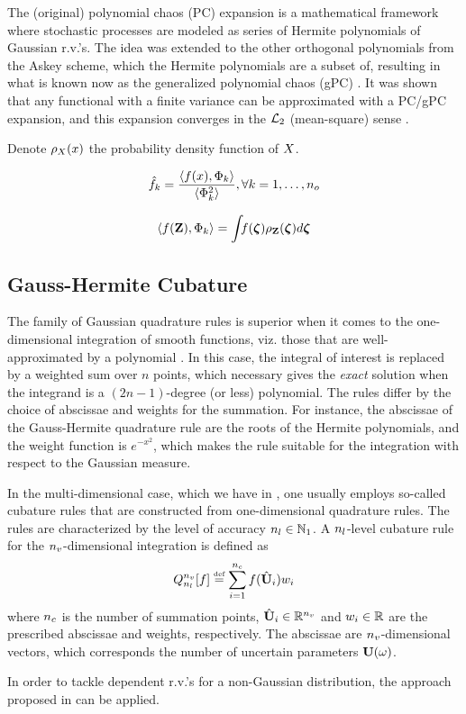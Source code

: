 The (original) polynomial chaos (PC) expansion is a mathematical framework where stochastic processes are modeled as series of Hermite polynomials of Gaussian r.v.'s. The idea was extended to the other orthogonal polynomials from the Askey scheme, which the Hermite polynomials are a subset of, resulting in what is known now as the generalized polynomial chaos (gPC) \cite{xiu2002}. It was shown that any functional with a finite variance can be approximated with a PC/gPC expansion, and this expansion converges in the $\mathcal{L}_{2}$ (mean-square) sense \cite{ghanem2003}.

Denote $\pdf_\rv{X}(x)$ the probability density function of $\rv{X}$.

\begin{equation} \elabel{pc-coefficients}
  \pcc{f}_k = \frac{\innerp{f(x), \pcb_k}}{\innerp{\pcb_k^2}}, \forall k = 1, \dotsc, \pcorder
\end{equation}

\begin{equation} \elabel{pc-integral}
  \innerp{f(\vIRV), \pcb_k} = \int_{} f(\virv) \pdf_\vIRV(\virv) d\virv
\end{equation}

\subsection{Gauss-Hermite Cubature}
The family of Gaussian quadrature rules is superior when it comes to the one-dimensional integration of smooth functions, viz. those that are well-approximated by a polynomial \cite{press2007}. In this case, the integral of interest is replaced by a weighted sum over $n$ points, which necessary gives the \emph{exact} solution when the integrand is a $(2n - 1)$-degree (or less) polynomial. The rules differ by the choice of abscissae and weights for the summation. For instance, the abscissae of the Gauss-Hermite quadrature rule are the roots of the Hermite polynomials, and the weight function is $e^{-x^2}$, which makes the rule suitable for the integration with respect to the Gaussian measure.

In the multi-dimensional case, which we have in , one usually employs so-called cubature rules that are constructed from one-dimensional quadrature rules. The rules are characterized by the level of accuracy ${n_l} \in \mathbb{N}_{1}$. A ${n_l}$-level cubature rule for the ${n_v}$-dimensional integration is defined as
\[
  \oCubature{\cblevel}{\vars}{f} \eqdef \sum_{i = 1}^{\cbpoints} f(\cbp{\vU}_i) w_i
\]
where ${n_c}$ is the number of summation points, $\cbp{\vU}_i \in \real^\vars$ and $w_i \in \mathbb{R}$ are the prescribed abscissae and weights, respectively. The abscissae are ${n_v}$-dimensional vectors, which corresponds the number of uncertain parameters $\vU(\o)$.

In order to tackle dependent r.v.'s for a non-Gaussian distribution, the approach proposed in \cite{babuska2010} can be applied.
